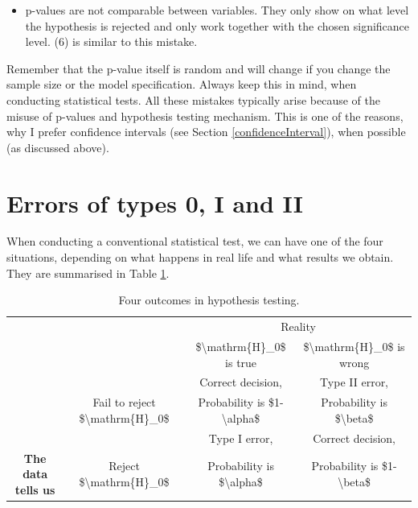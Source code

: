 \documentclass[
]{book}
\providecommand{\tightlist}{%
  \setlength{\itemsep}{0pt}\setlength{\parskip}{0pt}}
\theoremstyle{definition}
\theoremstyle{definition}
\theoremstyle{definition}
\theoremstyle{definition}
\theoremstyle{remark}
\begin{document}
\begin{itemize}
\tightlist
\item
  p-values are not comparable between variables. They only show on what level the hypothesis is rejected and only work together with the chosen significance level. (6) is similar to this mistake.
\end{itemize}

Remember that the p-value itself is random and will change if you change the sample size or the model specification. Always keep this in mind, when conducting statistical tests. All these mistakes typically arise because of the misuse of p-values and hypothesis testing mechanism. This is one of the reasons, why I prefer confidence intervals (see Section \ref{confidenceInterval}), when possible (as discussed above).

\section{Errors of types 0, I and II}\label{typeErrors}

When conducting a conventional statistical test, we can have one of the four situations, depending on what happens in real life and what results we obtain. They are summarised in Table \ref{tab:typeErrorsTable}.

\begin{table}

\caption{\label{tab:typeErrorsTable}Four outcomes in hypothesis testing.}
\centering
\fontsize{12}{14}\selectfont
\begin{tabular}[t]{>{}c|c|c|c}
\hline
\multicolumn{2}{c|}{ } & \multicolumn{2}{c}{Reality} \\
\cline{3-4}
 &  & \$\textbackslash{}mathrm\{H\}\_0\$ is true & \$\textbackslash{}mathrm\{H\}\_0\$ is wrong\\
\hline
 &  & Correct decision, & Type II error,\\
\cline{3-4}
 & \multirow{-2}{*}{\centering\arraybackslash Fail to reject \$\textbackslash{}mathrm\{H\}\_0\$} & Probability is \$1-\textbackslash{}alpha\$ & Probability is \$\textbackslash{}beta\$\\
\cline{2-4}
 &  & Type I error, & Correct decision,\\
\cline{3-4}
\multirow{-4}{*}{\centering\arraybackslash \textbf{The data tells us}} & \multirow{-2}{*}{\centering\arraybackslash Reject \$\textbackslash{}mathrm\{H\}\_0\$} & Probability is \$\textbackslash{}alpha\$ & Probability is \$1-\textbackslash{}beta\$\\
\hline
\end{tabular}
\end{table}
\end{document}
